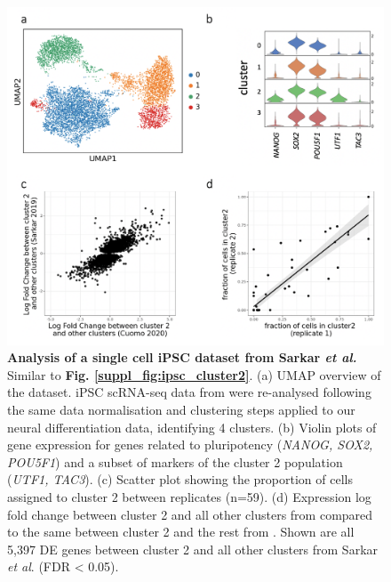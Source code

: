 \begin{figure}[h]
    \centering
    \includegraphics[width=15cm]{Appendix2/Fig/suppl_ipsc_cluster2_sarkar.png}
    \caption[Analysis of a single cell iPSC dataset from Sarkar \textit{et al.}]{\textbf{Analysis of a single cell iPSC dataset from Sarkar \textit{et al.}}\\
    Similar to \textbf{Fig. \ref{suppl_fig:ipsc_cluster2}}.
    (a) UMAP overview of the dataset. 
    iPSC scRNA-seq data from \cite{sarkar2019discovery} were re-analysed following the same data normalisation and clustering steps applied to our neural differentiation data, identifying 4 clusters. 
    (b) Violin plots of gene expression for genes related to pluripotency (\textit{NANOG, SOX2, POU5F1}) and a subset of markers of the cluster 2 population (\textit{UTF1, TAC3}). 
    (c) Scatter plot showing the proportion of cells assigned to cluster 2 between replicates (n=59). 
    (d) Expression log fold change between cluster 2 and all other clusters from \cite{cuomo2020single} compared to the same between cluster 2 and the rest from \cite{sarkar2019discovery}. 
    Shown are all 5,397 DE genes between cluster 2 and all other clusters from Sarkar \textit{et al}. (FDR < 0.05).}
    \label{suppl_fig:ipsc_cluster2_sarkar}
\end{figure}

